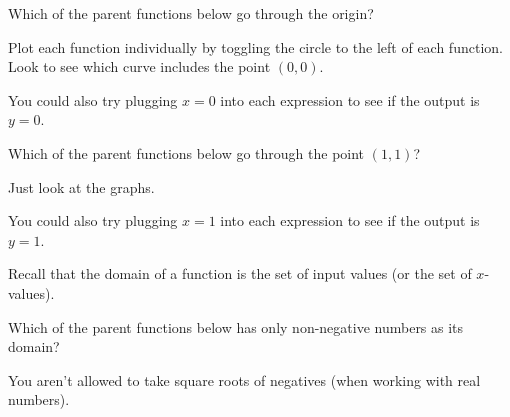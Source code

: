 \documentclass{ximera}
\begin{document}
\begin{question}
Which of the parent functions below go through the origin?

\begin{hint}
Plot each function individually by toggling the circle to the left of each function. Look to see which curve includes the point $(0,0)$.
\end{hint}
\begin{hint}
You could also try plugging $x=0$ into each expression to see if the output is $y=0$.
\end{hint}
\begin{multipleChoice}
\end{multipleChoice}

\end{question}

\begin{question}
Which of the parent functions below go through the point $(1,1)$?

\begin{hint}
Just look at the graphs.
\end{hint}
\begin{hint}
You could also try plugging $x=1$ into each expression to see if the output is $y=1$.
\end{hint}
\begin{multipleChoice}
\choice{All of them go through the point $(1,1)$.
\end{multipleChoice}

\end{question}

Recall that the domain of a function is the set of input values (or the set of $x$-values).

\begin{question}
Which of the parent functions below has only non-negative numbers as its domain?

\begin{hint}
You aren't allowed to take square roots of negatives (when working with real numbers).
\end{hint}
\begin{multipleChoice}
\end{multipleChoice}

\end{question}
\end{document}
